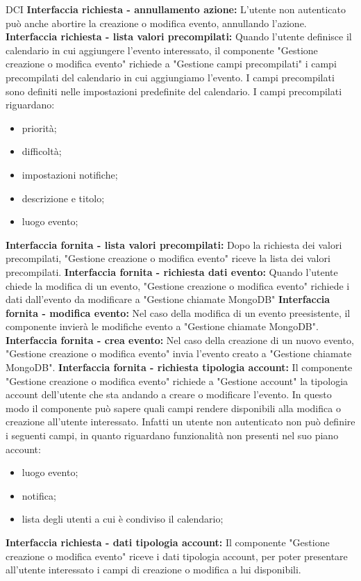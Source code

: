 \begin{listaPersonale}{DCI}
    \textbf{Interfaccia richiesta - annullamento azione:} L'utente non autenticato può anche abortire la creazione o modifica evento, annullando l'azione.
    \textbf{Interfaccia richiesta - lista valori precompilati:} Quando l'utente definisce il calendario in cui aggiungere l'evento interessato, il componente "Gestione creazione o modifica evento" richiede a "Gestione campi precompilati" i campi precompilati del calendario in cui aggiungiamo l'evento. I campi precompilati sono definiti nelle impostazioni predefinite del calendario.
    I campi precompilati riguardano:
    \begin{itemize}
        \item priorità;
        \item difficoltà;
        \item impostazioni notifiche;
        \item descrizione e titolo;
        \item luogo evento;
    \end{itemize}
    \textbf{Interfaccia fornita - lista valori precompilati:}  Dopo la richiesta dei valori precompilati, "Gestione creazione o modifica evento" riceve la lista dei valori precompilati.
    \textbf{Interfaccia fornita - richiesta dati evento:} Quando l'utente chiede la modifica di un evento, "Gestione creazione o modifica evento" richiede i dati dall'evento da modificare a "Gestione chiamate MongoDB"
    \textbf{Interfaccia fornita - modifica evento:} Nel caso della modifica di un evento preesistente, il componente invierà le modifiche evento a "Gestione chiamate MongoDB".
    \textbf{Interfaccia fornita - crea evento:} Nel caso della creazione di un nuovo evento, "Gestione creazione o modifica evento" invia l'evento creato a "Gestione chiamate MongoDB".
    \textbf{Interfaccia fornita - richiesta tipologia account:} Il componente "Gestione creazione o modifica evento" richiede a "Gestione account"  la tipologia account dell'utente che sta andando a creare o modificare l'evento. In questo modo il componente può sapere quali campi rendere disponibili alla modifica o creazione all'utente interessato. Infatti un utente non autenticato non può definire i seguenti campi, in quanto riguardano funzionalità non presenti nel suo piano account:
    \begin{itemize}
        \item luogo evento;
        \item notifica;
        \item lista degli utenti a cui è condiviso il calendario;
    \end{itemize}
    \textbf{Interfaccia richiesta - dati tipologia account:} Il componente "Gestione creazione o modifica evento" riceve i dati tipologia account, per poter presentare all'utente interessato i campi di creazione o modifica a lui disponibili.



\end{listaPersonale}
